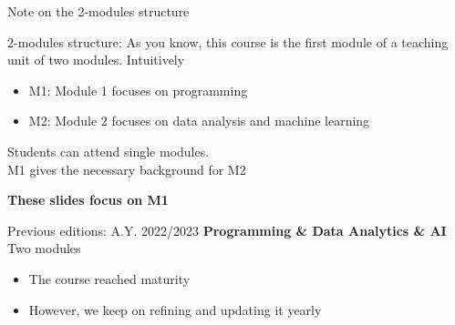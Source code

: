 \documentclass{beamer}%
\begin{document}
\begin{frame}{Note on the 2-modules structure}
	\begin{block}{2-modules structure: \myurl{\homepage}}
		As you know, this course is the first module of a teaching unit of two modules. Intuitively
		\begin{itemize}
			\item M1: Module 1 focuses on programming
			\item M2: Module 2 focuses  on data analysis and machine learning
		\end{itemize}
		Students can attend single modules. \\ M1 gives the necessary background for M2
		\begin{center}\textbf{These slides focus on M1}\end{center}
	\end{block}	
	\begin{block}{Previous editions: A.Y. 2022/2023}
		\textbf{Programming \& Data Analytics \& AI}\\ Two modules
		\begin{itemize}
			\item The course reached maturity
			\item However, we keep on refining and updating it yearly
		\end{itemize}
	\end{block}
\end{frame}
\end{document}
